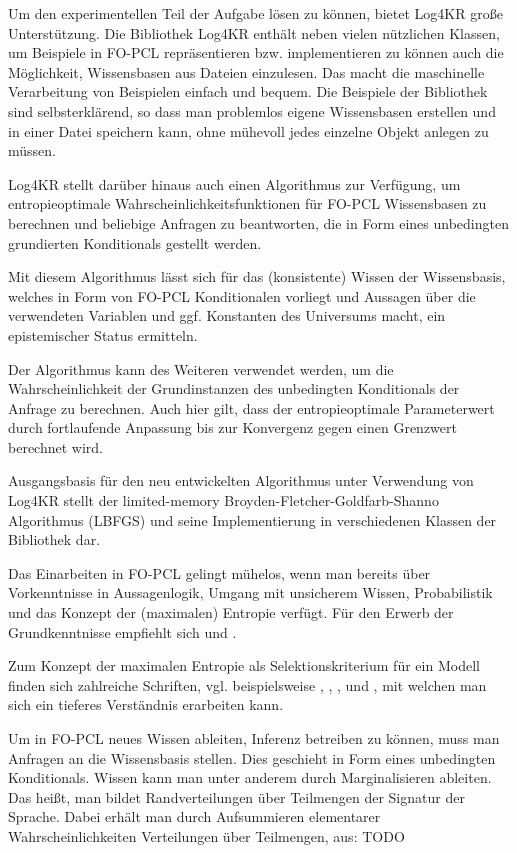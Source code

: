 \documentclass[a4paper, 11pt]{book}
\begin{document}
Um den experimentellen Teil der Aufgabe lösen zu können, bietet Log4KR große Unterstützung.
Die Bibliothek Log4KR enthält neben vielen nützlichen Klassen, um Beispiele in FO-PCL repräsentieren bzw. implementieren zu können auch die Möglichkeit, Wissensbasen aus Dateien einzulesen. Das macht die maschinelle Verarbeitung von Beispielen einfach und bequem. Die Beispiele der Bibliothek sind selbsterklärend, so dass man problemlos eigene Wissensbasen erstellen und in einer Datei speichern kann, ohne mühevoll jedes einzelne Objekt anlegen zu müssen.

Log4KR stellt darüber hinaus auch einen Algorithmus zur Verfügung, um entropieoptimale Wahrscheinlichkeitsfunktionen für FO-PCL Wissensbasen zu berechnen und beliebige Anfragen zu beantworten, die in Form eines unbedingten grundierten Konditionals gestellt werden. 

Mit diesem Algorithmus lässt sich für das (konsistente) Wissen der Wissensbasis, welches in Form von FO-PCL Konditionalen vorliegt und Aussagen über die verwendeten Variablen und ggf. Konstanten des Universums macht, ein epistemischer Status ermitteln.

Der Algorithmus kann des Weiteren verwendet werden, um die Wahrscheinlichkeit der Grundinstanzen des unbedingten Konditionals der Anfrage zu berechnen. Auch hier gilt, dass der entropieoptimale Parameterwert durch fortlaufende Anpassung bis zur Konvergenz gegen einen Grenzwert berechnet wird. 

Ausgangsbasis für den neu entwickelten Algorithmus unter Verwendung von Log4KR stellt der limited-memory Broyden-Fletcher-Goldfarb-Shanno Algorithmus (LBFGS) und seine Implementierung in verschiedenen Klassen der Bibliothek dar. 

Das Einarbeiten in FO-PCL gelingt mühelos, wenn man bereits über Vorkenntnisse in Aussagenlogik, Umgang mit unsicherem Wissen, Probabilistik  und das Konzept der (maximalen) Entropie verfügt. Für den Erwerb der Grundkenntnisse empfiehlt sich \cite{BKI08} und \cite{KK06}.

Zum Konzept der maximalen Entropie als Selektionskriterium für ein Modell finden sich zahlreiche Schriften, vgl. beispielsweise \cite{BHM14}, \cite{BK15}, \cite{Fis10}, \cite{RKI97} und \cite{TFLKIB10}, mit welchen man sich ein tieferes Verständnis erarbeiten kann.

Um in FO-PCL neues Wissen ableiten,  Inferenz betreiben zu können, muss man Anfragen an die Wissensbasis stellen. Dies geschieht in Form eines unbedingten Konditionals. Wissen kann man unter anderem durch Marginalisieren ableiten. Das heißt, man bildet Randverteilungen über Teilmengen der Signatur der Sprache. Dabei erhält man durch Aufsummieren elementarer Wahrscheinlichkeiten Verteilungen über Teilmengen, aus: \cite[Anhang A.2]{BKI08}
TODO
\end{document}
